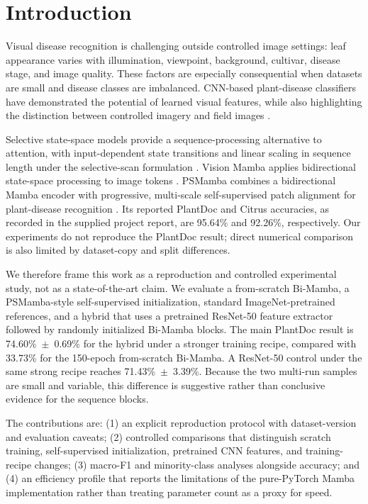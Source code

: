 \documentclass[conference]{IEEEtran}
\begin{document}
\section{Introduction}
Visual disease recognition is challenging outside controlled image settings: leaf appearance varies with illumination, viewpoint, background, cultivar, disease stage, and image quality. These factors are especially consequential when datasets are small and disease classes are imbalanced. CNN-based plant-disease classifiers have demonstrated the potential of learned visual features, while also highlighting the distinction between controlled imagery and field images \cite{mohanty2016plantdisease,singh2020plantdoc}.

Selective state-space models provide a sequence-processing alternative to attention, with input-dependent state transitions and linear scaling in sequence length under the selective-scan formulation \cite{gu2024mamba}. Vision Mamba applies bidirectional state-space processing to image tokens \cite{zhu2024visionmamba}. PSMamba combines a bidirectional Mamba encoder with progressive, multi-scale self-supervised patch alignment for plant-disease recognition \cite{almamun2026psmamba}. Its reported PlantDoc and Citrus accuracies, as recorded in the supplied project report, are 95.64\% and 92.26\%, respectively. Our experiments do not reproduce the PlantDoc result; direct numerical comparison is also limited by dataset-copy and split differences.

We therefore frame this work as a reproduction and controlled experimental study, not as a state-of-the-art claim. We evaluate a from-scratch Bi-Mamba, a PSMamba-style self-supervised initialization, standard ImageNet-pretrained references, and a hybrid that uses a pretrained ResNet-50 feature extractor followed by randomly initialized Bi-Mamba blocks. The main PlantDoc result is 74.60\%~$\pm$~0.69\% for the hybrid under a stronger training recipe, compared with 33.73\% for the 150-epoch from-scratch Bi-Mamba. A ResNet-50 control under the same strong recipe reaches 71.43\%~$\pm$~3.39\%. Because the two multi-run samples are small and variable, this difference is suggestive rather than conclusive evidence for the sequence blocks.

The contributions are: (1) an explicit reproduction protocol with dataset-version and evaluation caveats; (2) controlled comparisons that distinguish scratch training, self-supervised initialization, pretrained CNN features, and training-recipe changes; (3) macro-F1 and minority-class analyses alongside accuracy; and (4) an efficiency profile that reports the limitations of the pure-PyTorch Mamba implementation rather than treating parameter count as a proxy for speed.
\end{document}
